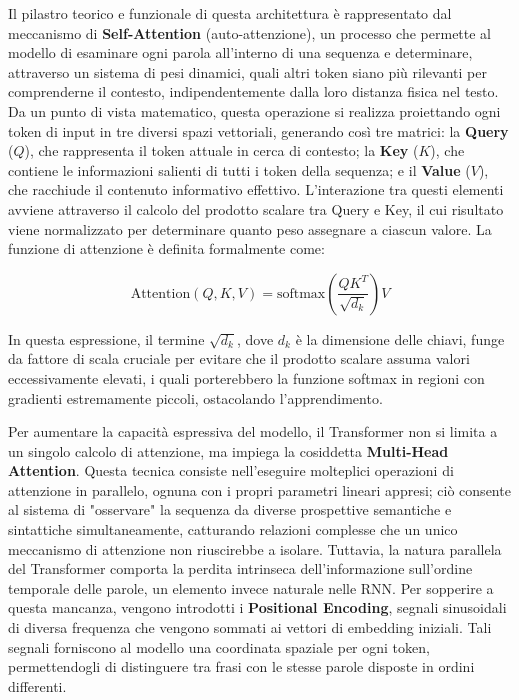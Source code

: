 Il pilastro teorico e funzionale di questa architettura è rappresentato dal meccanismo di \textbf{Self-Attention} (auto-attenzione), un processo che permette al modello di esaminare ogni parola all'interno di una sequenza e determinare, attraverso un sistema di pesi dinamici, quali altri token siano più rilevanti per comprenderne il contesto, indipendentemente dalla loro distanza fisica nel testo. Da un punto di vista matematico, questa operazione si realizza proiettando ogni token di input in tre diversi spazi vettoriali, generando così tre matrici: la \textbf{Query} ($Q$), che rappresenta il token attuale in cerca di contesto; la \textbf{Key} ($K$), che contiene le informazioni salienti di tutti i token della sequenza; e il \textbf{Value} ($V$), che racchiude il contenuto informativo effettivo. L'interazione tra questi elementi avviene attraverso il calcolo del prodotto scalare tra Query e Key, il cui risultato viene normalizzato per determinare quanto peso assegnare a ciascun valore. La funzione di attenzione è definita formalmente come:

\begin{equation}
	\text{Attention}(Q, K, V) = \text{softmax}\left(\frac{QK^T}{\sqrt{d_k}}\right)V
\end{equation}

In questa espressione, il termine $\sqrt{d_k}$, dove $d_k$ è la dimensione delle chiavi, funge da fattore di scala cruciale per evitare che il prodotto scalare assuma valori eccessivamente elevati, i quali porterebbero la funzione softmax in regioni con gradienti estremamente piccoli, ostacolando l'apprendimento.



Per aumentare la capacità espressiva del modello, il Transformer non si limita a un singolo calcolo di attenzione, ma impiega la cosiddetta \textbf{Multi-Head Attention}. Questa tecnica consiste nell'eseguire molteplici operazioni di attenzione in parallelo, ognuna con i propri parametri lineari appresi; ciò consente al sistema di "osservare" la sequenza da diverse prospettive semantiche e sintattiche simultaneamente, catturando relazioni complesse che un unico meccanismo di attenzione non riuscirebbe a isolare. Tuttavia, la natura parallela del Transformer comporta la perdita intrinseca dell'informazione sull'ordine temporale delle parole, un elemento invece naturale nelle RNN. Per sopperire a questa mancanza, vengono introdotti i \textbf{Positional Encoding}, segnali sinusoidali di diversa frequenza che vengono sommati ai vettori di embedding iniziali. Tali segnali forniscono al modello una coordinata spaziale per ogni token, permettendogli di distinguere tra frasi con le stesse parole disposte in ordini differenti.


